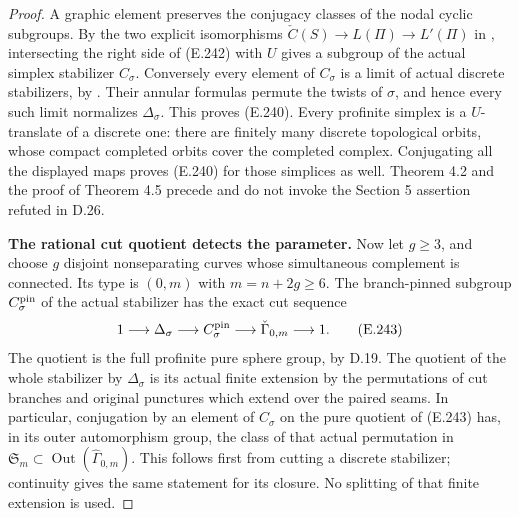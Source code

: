 \begin{proof}
A graphic element preserves the conjugacy classes of the
nodal cyclic subgroups.  By the two explicit isomorphisms
$\check C(S)\to L(\Pi)\to L'(\Pi)$ in
\cite[Theorem 4.2]{ET_Boggi2014}, intersecting the right
side of (E.242) with $U$ gives a subgroup of the actual
simplex stabilizer $C_\sigma$.
Conversely every element of $C_\sigma$ is a limit of
actual discrete stabilizers, by
\cite[Theorem 4.5]{ET_Boggi2014}.  Their annular formulas
permute the twists of $\sigma$, and hence every such
limit normalizes $\Delta_\sigma$.  This proves (E.240).
Every profinite simplex is a $U$-translate of a discrete
one: there are finitely many discrete topological
orbits, whose compact completed orbits cover the completed
complex.  Conjugating all the displayed maps proves
(E.240) for those simplices as well.
Theorem 4.2 and the proof of Theorem 4.5 precede and do
not invoke the Section 5 assertion refuted in D.26.

\textbf{The rational cut quotient detects the parameter.}
Now let $g\geq3$, and choose $g$ disjoint nonseparating
curves whose simultaneous complement is connected.
Its type is $(0,m)$ with $m=n+2g\geq6$.
The branch-pinned subgroup $C_\sigma^{\rm pin}$ of the
actual stabilizer has the exact cut sequence
\[
 1\longrightarrow\Delta_\sigma
  \longrightarrow C_\sigma^{\rm pin}
  \longrightarrow\check\Gamma_{0,m}
  \longrightarrow1.
                                                               \tag{E.243}
\]
The quotient is the full profinite pure sphere group,
by D.19.  The quotient of the whole stabilizer by
$\Delta_\sigma$ is its actual finite extension by the
permutations of cut branches and original punctures
which extend over the paired seams.  In particular,
conjugation by an element of $C_\sigma$ on the pure
quotient of (E.243) has, in its outer automorphism group,
the class of that actual permutation in
$\mathfrak S_m\subset
\operatorname{Out}(\widehat\Gamma_{0,m})$.
This follows first from cutting a discrete stabilizer;
continuity gives the same statement for its closure.
No splitting of that finite extension is used.


\end{proof}
